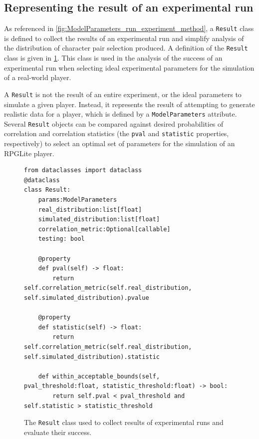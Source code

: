 \subsection{Representing the result of an experimental run}

As referenced in \cref{fig:ModelParameters_run_experiment_method}, a
\lstinline{Result} class is defined to collect the results of an experimental
run and simplify analysis of the distribution of character pair selection
produced. A definition of the \lstinline{Result} class is given in
\cref{fig:Result_class}. This class is used in the analysis of the success of an
experimental run when selecting ideal experimental parameters for the simulation
of a real-world player.

A \lstinline{Result} is not the result of an entire experiment, or the ideal
parameters to simulate a given player. Instead, it represents the result of
attempting to generate realistic data for a player, which is defined by a
\lstinline{ModelParameters} attribute. Several \lstinline{Result} objects can be
compared against desired probabilities of correlation and correlation statistics
(the \lstinline{pval} and \lstinline{statistic} properties, respectively) to
select an optimal set of parameters for the simulation of an RPGLite player.


\begin{figure}
  \begin{center}
    \begin{lstlisting}
from dataclasses import dataclass
@dataclass
class Result:
    params:ModelParameters
    real_distribution:list[float]
    simulated_distribution:list[float]
    correlation_metric:Optional[callable]
    testing: bool

    @property
    def pval(self) -> float:
        return self.correlation_metric(self.real_distribution, self.simulated_distribution).pvalue

    @property
    def statistic(self) -> float:
        return self.correlation_metric(self.real_distribution, self.simulated_distribution).statistic

    def within_acceptable_bounds(self, pval_threshold:float, statistic_threshold:float) -> bool:
        return self.pval < pval_threshold and self.statistic > statistic_threshold
    \end{lstlisting}
  \end{center}
  \caption{The \lstinline{Result} class used to collect results of experimental
  runs and evaluate their success.}
  \label{fig:Result_class}
\end{figure}



